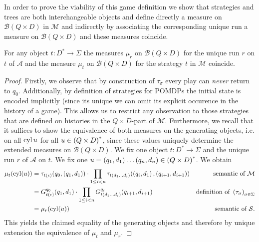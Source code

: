 In order to prove the viability of this game definition we show that strategies
and trees are both interchangeable objects and define directly a measure on
$\mathcal{B}(Q\times D)$ in $\mathcal{M}$ and indirectly by associating the 
corresponding unique run a measure on $\mathcal{B}(Q\times D)$ and these 
measures coincide.
\begin{theorem}
  For any object $t:D^{*}\rightarrow\Sigma$ the measures $\mu_{r}$ on 
  $\mathcal{B}(Q\times D)$ for the unique run $r$ on $t$ of $\mathcal{A}$ and
  the measure $\mu_{t}$ on $\mathcal{B}(Q\times D)$ for the strategy $t$ in
  $\mathcal{M}$ coincide.
\end{theorem}
\begin{proof}
  Firstly, we observe that by construction of $\tau_{\sigma}$ every play can
  \emph{never} return to $q_{0}$. Additionally, by definition of strategies for
  \acp{POMDP} the initial state is encoded implicitly (since its unique we can
  omit its explicit occurence in the history of a game). This allows us to 
  restrict any observation to those strategies that are defined on histories in
  the $Q\times D$-part of $\mathcal{M}$. Furthermore, we recall that it 
  suffices to show the equivalence of both measures on the generating objects, 
  i.e. on all $\operatorname{cyl}{u}$ for all $u\in\left(Q\times D\right)^{*}$, since these values 
  uniquely determine the extended measures on $\mathcal{B}(Q\times D)$. We fix 
  one object $t:D^{*}\rightarrow\Sigma$ and the unique run $r$ of $\mathcal{A}$ 
  on $t$. We fix one 
  $u = \left(q_{1}, d_{1}\right)\dots\left(q_{n}, d_{n}\right)\in\left(Q\times D\right)^{*}$. 
  We obtain
  \begin{align*}
    \mu_{t}(\operatorname{cyl}(u)) &= \tau_{t(\epsilon)}(q_{0}, \left(q_{1}, d_{1}\right))\cdot
      \prod\limits_{1\leq i < n}\tau_{t(d_{1}\dots d_{i})}(
        \left(q_{i}, d_{1}\right), \left(q_{i+1}, d_{i+1}\right))&
          \text{semantic of }\mathcal{M}\\
    &= G_{t(\epsilon)}^{q_{0}}(q_{1}, d_{1})\cdot\prod\limits_{1\leq i < n}
      G_{t(d_{1}\dots d_{i})}^{q_{i}}(q_{i+1}, d_{i+1})&
          \text{definition of }\left(\tau_{\sigma}\right)_{\sigma\in\Sigma}\\
    &= \mu_{r}(\operatorname{cyl}(u))&\text{semantic of }\mathcal{S}.
  \end{align*}
  This yields the claimed equality of the generating objects and therefore by
  unique extension the equivalence of $\mu_{t}$ and $\mu_{r}$.
\end{proof}


